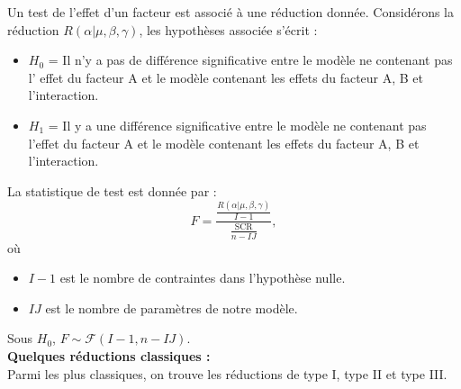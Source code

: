 \documentclass[12pt,a4paper]{report}
\begin{document}
	Un test de l'effet d'un facteur est associé à une réduction donnée. Considérons la réduction $R(\alpha|\mu,\beta,\gamma)$, les hypothèses associée s'écrit : 
	\begin{itemize}
		\item $H_0$ = Il n'y a pas de différence significative entre le modèle ne contenant pas l' effet du facteur A et le modèle contenant les effets du facteur A, B et l'interaction.
	   \item $H_1$ = Il y a une différence significative entre le modèle ne contenant pas l'effet du facteur A et le modèle contenant les effets du facteur A, B et l'interaction.
	\end{itemize}
	La statistique de test est donnée par : 
	\begin{equation}
		F = \frac{\frac{R(\alpha|\mu,\beta,\gamma)}{I-1}}{\frac{\text{SCR}}{n-IJ}},
	\end{equation}
	où 
	\begin{itemize}
		\item $I-1$ est le nombre de contraintes dans l'hypothèse nulle.
		\item $IJ$ est le nombre de paramètres de notre modèle.
	\end{itemize}
	Sous $H_0$, $F \sim \mathcal{F}(I-1, n-IJ)$.\\
	
	\textbf{Quelques réductions classiques :} \\
	Parmi les plus classiques, on trouve les réductions de type I, type II et type III.
	
\end{document}
